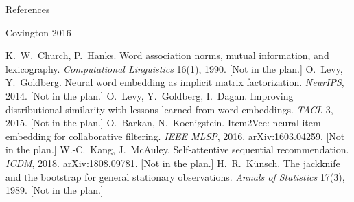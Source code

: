 \documentclass[aspectratio=169,10pt]{beamer}
\begin{document}
\begin{frame}[allowframebreaks,t]{References}
  \begin{thebibliography}{Covington 2016}
    \scriptsize
    
     K.~W.~Church, P.~Hanks. Word association norms, mutual information, and lexicography. \emph{Computational Linguistics} 16(1), 1990. [Not in the plan.]
     O.~Levy, Y.~Goldberg. Neural word embedding as implicit matrix factorization. \emph{NeurIPS}, 2014. [Not in the plan.]
     O.~Levy, Y.~Goldberg, I.~Dagan. Improving distributional similarity with lessons learned from word embeddings. \emph{TACL} 3, 2015. [Not in the plan.]
     O.~Barkan, N.~Koenigstein. Item2Vec: neural item embedding for collaborative filtering. \emph{IEEE MLSP}, 2016. arXiv:1603.04259. [Not in the plan.]
     W.-C.~Kang, J.~McAuley. Self-attentive sequential recommendation. \emph{ICDM}, 2018. arXiv:1808.09781. [Not in the plan.]
     H.~R.~Künsch. The jackknife and the bootstrap for general stationary observations. \emph{Annals of Statistics} 17(3), 1989. [Not in the plan.]
  \end{thebibliography}
\end{frame}
\end{document}
